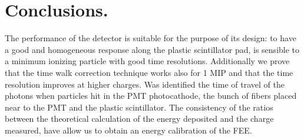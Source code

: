 \section{Conclusions.}

The performance of the detector is suitable for the purpose of its design: to have a good and homogeneous response 
along the plastic scintillator pad, is sensible to a minimum ionizing particle with good time resolutions. 
Additionally we prove that the time walk correction technique works also for 1 MIP and that the time resolution improves at higher charges.
Was identified the time of travel of the photons when particles hit in the PMT photocathode, the bunch of fibers 
placed near to the PMT and the plastic scintillator. 
The consistency of the ratios between the theoretical calculation of the energy deposited and the charge measured, have allow us to obtain an energy calibration of the FEE.
